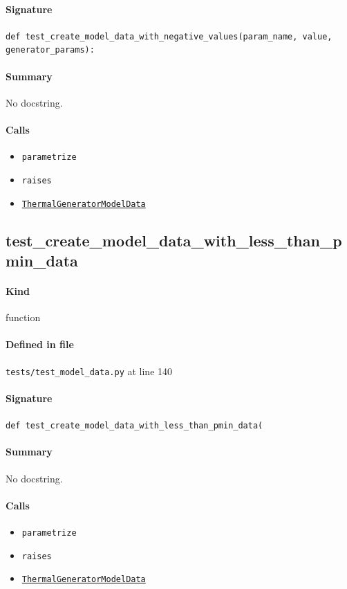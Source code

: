 \documentclass[11pt]{report}
\begin{document}
\paragraph{Signature} \texttt{def test\_create\_model\_data\_with\_negative\_values(param\_name, value, generator\_params):}
\paragraph{Summary} No docstring.
\paragraph{Calls}
\begin{itemize}[leftmargin=*]
  \item \texttt{parametrize}
  \item \texttt{raises}
  \item \hyperref[def:model_data.py:ThermalGeneratorModelData:L185]{\texttt{ThermalGeneratorModelData}}
\end{itemize}
\subsection{test\_create\_model\_data\_with\_less\_than\_pmin\_data}
\label{def:tests-test_model_data.py:test_create_model_data_with_less_than_pmin_data:L140}
\paragraph{Kind} function
\paragraph{Defined in file} \texttt{tests/test\_model\_data.py} at line 140
\paragraph{Signature} \texttt{def test\_create\_model\_data\_with\_less\_than\_pmin\_data(}
\paragraph{Summary} No docstring.
\paragraph{Calls}
\begin{itemize}[leftmargin=*]
  \item \texttt{parametrize}
  \item \texttt{raises}
  \item \hyperref[def:model_data.py:ThermalGeneratorModelData:L185]{\texttt{ThermalGeneratorModelData}}
\end{itemize}
\end{document}
